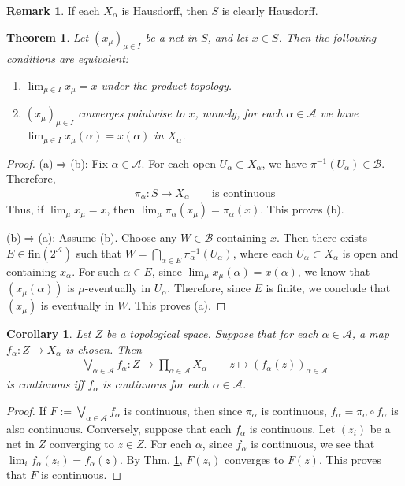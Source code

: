 \documentclass[12pt,b5paper,notitlepage]{article}
\theoremstyle{definition}
\newtheorem{rem}[df]{Remark}
\theoremstyle{plain}
\newtheorem{thm}[df]{Theorem}
\newtheorem{co}[df]{Corollary}
\newcommand{\mc}{\mathcal}
\newcommand{\scr}{\mathscr}
\newcommand{\fin}{\mathrm{fin}}
\newcommand{\dps}{\displaystyle}
\newcommand{\MB}{\mathcal B}
\numberwithin{equation}{section}
\begin{document}
\begin{rem}
If each $X_\alpha$ is Hausdorff, then $S$ is clearly Hausdorff.
\end{rem}


\begin{thm}\label{lb50}
Let $(x_\mu)_{\mu\in I}$ be a net in $S$, and let $x\in S$. Then the following conditions are equivalent:
\begin{enumerate}[label=(\alph*)]
\item $\dps\lim_{\mu\in I}x_\mu=x$ under the product topology.
\item $(x_\mu)_{\mu\in I}$ converges pointwise to $x$, namely, for each $\alpha\in\scr A$ we have $\dps\lim_{\mu\in I}x_\mu(\alpha)=x(\alpha)$ in $X_\alpha$.
\end{enumerate}
\end{thm}


\begin{proof}
(a)$\Rightarrow$(b): Fix $\alpha\in\scr A$. For each open $U_\alpha\subset X_\alpha$, we have $\pi^{-1}(U_\alpha)\in\mc B$. Therefore,
\begin{align}
\pi_\alpha:S\rightarrow X_\alpha\qquad\text{is continuous}
\end{align}
Thus, if $\lim_\mu x_\mu=x$, then $\lim_\mu \pi_\alpha(x_\mu)=\pi_\alpha(x)$. This proves (b).

(b)$\Rightarrow$(a): Assume (b). Choose any $W\in\MB$ containing $x$. Then there exists $E\in\fin(2^{\scr A})$ such that $W=\bigcap_{\alpha\in E}\pi_\alpha^{-1}(U_\alpha)$, where each $U_\alpha\subset X_\alpha$ is open and containing $x_\alpha$. For such $\alpha\in E$, since $\lim_\mu x_\mu(\alpha)=x(\alpha)$, we know that $(x_\mu(\alpha))$ is $\mu$-eventually in $U_\alpha$. Therefore, since $E$ is finite, we conclude that $(x_\mu)$ is eventually in $W$. This proves (a).
\end{proof}

\begin{co}\label{lb55}
Let $Z$ be a topological space. Suppose that for each $\alpha\in\scr A$, a map $f_\alpha:Z\rightarrow X_\alpha$  is chosen. Then \index{zz@$\bigvee_{\alpha\in\scr A}f_\alpha$}
\begin{gather}
\bigvee_{\alpha\in\scr A}f_\alpha:Z\rightarrow\prod_{\alpha\in\scr A}X_\alpha\qquad z\mapsto (f_\alpha(z))_{\alpha\in\scr A}
\end{gather}
is continuous iff $f_\alpha$ is continuous for each $\alpha\in\scr A$.
\end{co}

\begin{proof}
If $F:=\bigvee_{\alpha\in\scr A}f_\alpha$ is continuous, then since $\pi_\alpha$ is continuous, $f_\alpha=\pi_\alpha\circ f_\alpha$ is also continuous. Conversely, suppose that each $f_\alpha$ is continuous. Let $(z_i)$ be a net in $Z$ converging to $z\in Z$. For each $\alpha$, since $f_\alpha$ is continuous, we see that $\lim_if_\alpha(z_i)=f_\alpha(z)$. By Thm. \ref{lb50}, $F(z_i)$ converges to $F(z)$. This proves that $F$ is continuous.
\end{proof}
\end{document}
